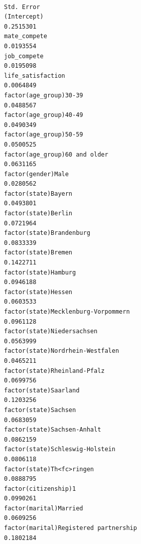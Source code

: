 \documentclass[
]{article}
\begin{document}
\begin{table}
\begin{minipage}[t]{\linewidth}
{\begin{verbatim}
                                                                                  Std. Error
(Intercept)                                                                        0.2515301
mate_compete                                                                       0.0193554
job_compete                                                                        0.0195098
life_satisfaction                                                                  0.0064849
factor(age_group)30-39                                                             0.0488567
factor(age_group)40-49                                                             0.0490349
factor(age_group)50-59                                                             0.0500525
factor(age_group)60 and older                                                      0.0631165
factor(gender)Male                                                                 0.0280562
factor(state)Bayern                                                                0.0493801
factor(state)Berlin                                                                0.0721964
factor(state)Brandenburg                                                           0.0833339
factor(state)Bremen                                                                0.1422711
factor(state)Hamburg                                                               0.0946188
factor(state)Hessen                                                                0.0603533
factor(state)Mecklenburg-Vorpommern                                                0.0961128
factor(state)Niedersachsen                                                         0.0563999
factor(state)Nordrhein-Westfalen                                                   0.0465211
factor(state)Rheinland-Pfalz                                                       0.0699756
factor(state)Saarland                                                              0.1203256
factor(state)Sachsen                                                               0.0683059
factor(state)Sachsen-Anhalt                                                        0.0862159
factor(state)Schleswig-Holstein                                                    0.0806118
factor(state)Th<fc>ringen                                                          0.0888795
factor(citizenship)1                                                               0.0990261
factor(marital)Married                                                             0.0609256
factor(marital)Registered partnership                                              0.1802184

\end{verbatim}}
\end{minipage}
\end{table}
\end{document}
